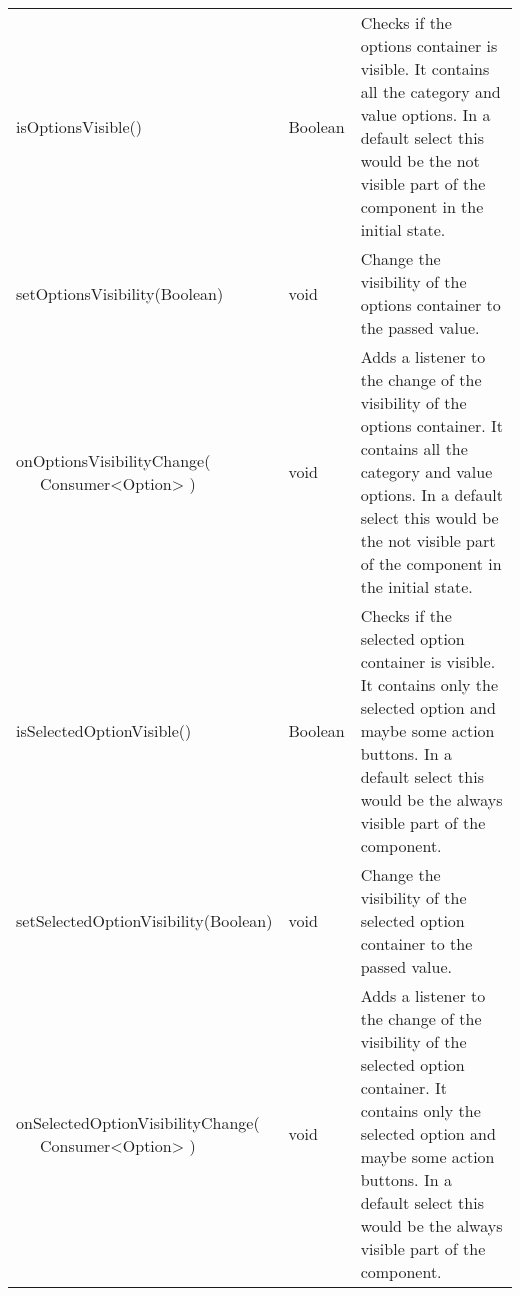 \begin{table}[!htb]
\begin{tabular}{ p{5cm} p{3cm} p{5cm} }
        isOptionsVisible()                   & Boolean                & Checks if the options container is visible. 
                                                                        It contains all the category and value options. 
                                                                        In a default select this would be the not visible part of the component in the initial state. \\
        setOptionsVisibility(Boolean)        & void                   & Change the visibility of the options container to the passed value. \\
        \tbbr{
            onOptionsVisibilityChange( \\
                \ \ \ Consumer<Option>
            )}                               & void                   & Adds a listener to the change of the visibility of the options container. 
                                                                        It contains all the category and value options. 
                                                                        In a default select this would be the not visible part of the component in the initial state. \\
        isSelectedOptionVisible()            & Boolean                & Checks if the selected option container is visible. 
                                                                        It contains only the selected option and maybe some action buttons. 
                                                                        In a default select this would be the always visible part of the component. \\
        setSelectedOptionVisibility(Boolean) & void                   & Change the visibility of the selected option container to the passed value. \\
        \tbbr{
            onSelectedOptionVisibilityChange( \\
                \ \ \ Consumer<Option>
            )}                               & void                   & Adds a listener to the change of the visibility of the selected option container. 
                                                                        It contains only the selected option and maybe some action buttons. 
                                                                        In a default select this would be the always visible part of the component. \\
        \bottomrule[0.5pt]
    \end{tabular}
\end{table}

